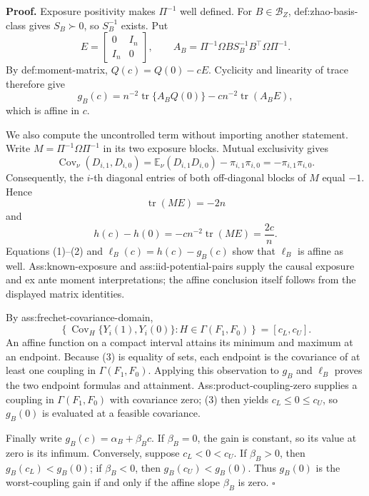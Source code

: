 \textbf{Proof.}
Exposure positivity makes \(\Pi^{-1}\) well defined.  For \(B\in\mathcal B_Z\), def:zhao-basis-class gives \(S_B\succ0\), so \(S_B^{-1}\) exists.  Put
\[
E=\begin{bmatrix}0&I_n\\ I_n&0\end{bmatrix},
\qquad
A_B=\Pi^{-1}\Omega B S_B^{-1}B^{\top}\Omega\Pi^{-1}.
\]
By def:moment-matrix, \(Q(c)=Q(0)-cE\).  Cyclicity and linearity of trace therefore give
\[
g_B(c)=n^{-2}\operatorname{tr}\{A_BQ(0)\}
-cn^{-2}\operatorname{tr}(A_BE),                                      \tag{1}
\]
which is affine in \(c\).

We also compute the uncontrolled term without importing another statement.  Write
\(M=\Pi^{-1}\Omega\Pi^{-1}\) in its two exposure blocks.  Mutual exclusivity gives
\[
\operatorname{Cov}_{\nu}(D_{i,1},D_{i,0})
=\mathbb E_{\nu}(D_{i,1}D_{i,0})-\pi_{i,1}\pi_{i,0}
=-\pi_{i,1}\pi_{i,0}.
\]
Consequently, the \(i\)-th diagonal entries of both off-diagonal blocks of \(M\) equal \(-1\).  Hence
\[
\operatorname{tr}(ME)=-2n
\]
and
\[
h(c)-h(0)
=-cn^{-2}\operatorname{tr}(ME)
=\frac{2c}{n}.                                                        \tag{2}
\]
Equations (1)--(2) and \(\ell_B(c)=h(c)-g_B(c)\) show that \(\ell_B\) is affine as well.  Ass:known-exposure and ass:iid-potential-pairs supply the causal exposure and ex ante moment interpretations; the affine conclusion itself follows from the displayed matrix identities.

By ass:frechet-covariance-domain,
\[
\left\{\operatorname{Cov}_H\{Y_i(1),Y_i(0)\}:H\in\Gamma(F_1,F_0)\right\}
=[c_L,c_U].                                                          \tag{3}
\]
An affine function on a compact interval attains its minimum and maximum at an endpoint.  Because (3) is equality of sets, each endpoint is the covariance of at least one coupling in \(\Gamma(F_1,F_0)\).  Applying this observation to \(g_B\) and \(\ell_B\) proves the two endpoint formulas and attainment.  Ass:product-coupling-zero supplies a coupling in \(\Gamma(F_1,F_0)\) with covariance zero; (3) then yields \(c_L\le0\le c_U\), so \(g_B(0)\) is evaluated at a feasible covariance.

Finally write \(g_B(c)=\alpha_B+\beta_Bc\).  If \(\beta_B=0\), the gain is constant, so its value at zero is its infimum.  Conversely, suppose \(c_L<0<c_U\).  If \(\beta_B>0\), then \(g_B(c_L)<g_B(0)\); if \(\beta_B<0\), then \(g_B(c_U)<g_B(0)\).  Thus \(g_B(0)\) is the worst-coupling gain if and only if the affine slope \(\beta_B\) is zero. \(\square\)